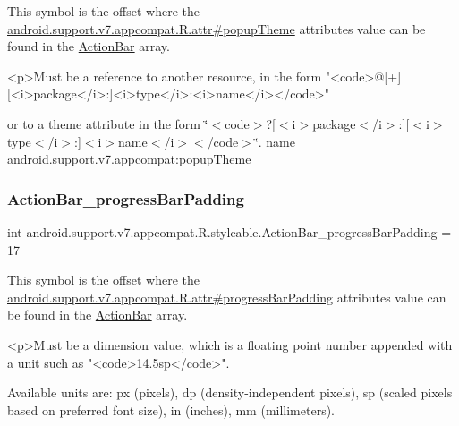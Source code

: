This symbol is the offset where the \hyperlink{classandroid_1_1support_1_1v7_1_1appcompat_1_1R_1_1attr_a7163bdfa188237fc5f6cb7ec583125e4}{android.\+support.\+v7.\+appcompat.\+R.\+attr\#popup\+Theme} attribute\textquotesingle{}s value can be found in the \hyperlink{classandroid_1_1support_1_1v7_1_1appcompat_1_1R_1_1styleable_a5941dc15714398e9ec9afaa0155cc1cf}{Action\+Bar} array.

\begin{DoxyVerb}      <p>Must be a reference to another resource, in the form "<code>@[+][<i>package</i>:]<i>type</i>:<i>name</i></code>"
\end{DoxyVerb}
 or to a theme attribute in the form \char`\"{}$<$code$>$?\mbox{[}$<$i$>$package$<$/i$>$\+:\mbox{]}\mbox{[}$<$i$>$type$<$/i$>$\+:\mbox{]}$<$i$>$name$<$/i$>$$<$/code$>$\char`\"{}.  name android.\+support.\+v7.\+appcompat\+:popup\+Theme \mbox{\label{classandroid_1_1support_1_1v7_1_1appcompat_1_1R_1_1styleable_ac185772374425947fc0c482c54c60753}} 
\subsubsection{\texorpdfstring{Action\+Bar\+\_\+progress\+Bar\+Padding}{ActionBar\_progressBarPadding}}
{\footnotesize\ttfamily int android.\+support.\+v7.\+appcompat.\+R.\+styleable.\+Action\+Bar\+\_\+progress\+Bar\+Padding = 17\hspace{0.3cm}{\ttfamily [static]}}

This symbol is the offset where the \hyperlink{classandroid_1_1support_1_1v7_1_1appcompat_1_1R_1_1attr_a8538b6aa3f3da37516587bcb65e85d3a}{android.\+support.\+v7.\+appcompat.\+R.\+attr\#progress\+Bar\+Padding} attribute\textquotesingle{}s value can be found in the \hyperlink{classandroid_1_1support_1_1v7_1_1appcompat_1_1R_1_1styleable_a5941dc15714398e9ec9afaa0155cc1cf}{Action\+Bar} array.

\begin{DoxyVerb}      <p>Must be a dimension value, which is a floating point number appended with a unit such as "<code>14.5sp</code>".
\end{DoxyVerb}
 Available units are\+: px (pixels), dp (density-\/independent pixels), sp (scaled pixels based on preferred font size), in (inches), mm (millimeters). 

